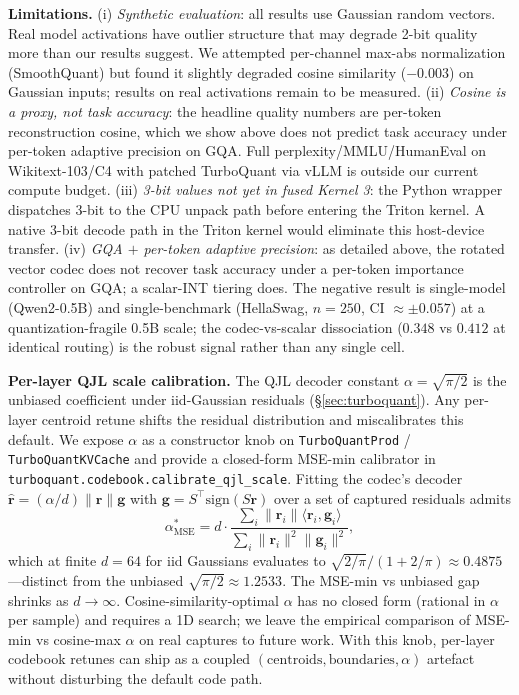 \documentclass{article}
\newcommand{\bm}[1]{\boldsymbol{#1}}
\begin{document}
\textbf{Limitations.}
(i) \textit{Synthetic evaluation}: all results use Gaussian random vectors. Real model activations have outlier structure \citep{xiao2023smoothquant} that may degrade 2-bit quality more than our results suggest. We attempted per-channel max-abs normalization (SmoothQuant) but found it slightly degraded cosine similarity ($-0.003$) on Gaussian inputs; results on real activations remain to be measured.
(ii) \textit{Cosine is a proxy, not task accuracy}: the headline quality numbers are per-token reconstruction cosine, which we show above does not predict task accuracy under per-token adaptive precision on GQA. Full perplexity/MMLU/HumanEval on Wikitext-103/C4 with patched TurboQuant via vLLM is outside our current compute budget.
(iii) \textit{3-bit values not yet in fused Kernel 3}: the Python wrapper dispatches 3-bit to the CPU unpack path before entering the Triton kernel. A native 3-bit decode path in the Triton kernel would eliminate this host-device transfer.
(iv) \textit{GQA $+$ per-token adaptive precision}: as detailed above, the rotated vector codec does not recover task accuracy under a per-token importance controller on GQA; a scalar-INT tiering does. The negative result is single-model (Qwen2-0.5B) and single-benchmark (HellaSwag, $n{=}250$, CI $\approx\pm0.057$) at a quantization-fragile 0.5B scale; the codec-vs-scalar dissociation ($0.348$ vs $0.412$ at identical routing) is the robust signal rather than any single cell.

\textbf{Per-layer QJL scale calibration.}
The QJL decoder constant $\alpha = \sqrt{\pi/2}$ is the unbiased coefficient under iid-Gaussian residuals (\S\ref{sec:turboquant}). Any per-layer centroid retune shifts the residual distribution and miscalibrates this default. We expose $\alpha$ as a constructor knob on \texttt{TurboQuantProd} / \texttt{TurboQuantKVCache} and provide a closed-form MSE-min calibrator in \texttt{turboquant.codebook.calibrate\_qjl\_scale}. Fitting the codec's decoder $\hat{\bm{r}} = (\alpha/d) \|\bm{r}\| \bm{g}$ with $\bm{g} = S^\top \mathrm{sign}(S\bm{r})$ over a set of captured residuals admits
\[
\alpha^*_{\mathrm{MSE}} = d \cdot \frac{\sum_i \|\bm{r}_i\| \langle \bm{r}_i, \bm{g}_i \rangle}{\sum_i \|\bm{r}_i\|^2 \|\bm{g}_i\|^2},
\]
which at finite $d=64$ for iid Gaussians evaluates to $\sqrt{2/\pi} / (1 + 2/\pi) \approx 0.4875$—distinct from the unbiased $\sqrt{\pi/2} \approx 1.2533$. The MSE-min vs unbiased gap shrinks as $d \to \infty$. Cosine-similarity-optimal $\alpha$ has no closed form (rational in $\alpha$ per sample) and requires a 1D search; we leave the empirical comparison of MSE-min vs cosine-max $\alpha$ on real captures to future work. With this knob, per-layer codebook retunes can ship as a coupled $(\text{centroids}, \text{boundaries}, \alpha)$ artefact without disturbing the default code path.
\end{document}
